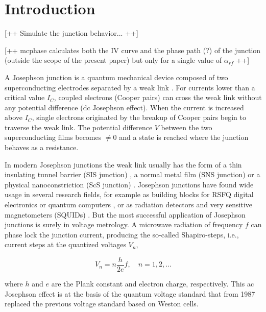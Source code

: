 \section{Introduction}


[++ Simulate the junction behavior... ++]

[++ mcphase calculates both the IV curve and the phase path (?) of the junction (outside the scope of the present paper) but only for a single value of $\alpha_{rf}$   ++]

A Josephson junction is a quantum mechanical device composed of two superconducting electrodes separated by a weak link \cite{Barone:1982}.
For currents lower than a critical value $I_C$, coupled electrons (Cooper pairs) can cross the weak link without any potential difference (dc Josephson effect).
When the current is increased above $I_C$, single electrons originated by the breakup of Cooper pairs begin to traverse the weak link. The potential difference $V$ between the two superconducting films becomes $\neq 0$ and a state is reached where the junction behaves as a resistance.

In modern Josephson junctions the weak link usually has the form of a thin insulating tunnel barrier (SIS junction) \cite{Gurvitch:1983}, a normal metal film (SNS junction) \cite{Benz:1995} or a physical nanoconstriction (ScS junction) \cite{Cybart:2015, DeLeo:2016}. Josephson junctions have found wide usage in several research fields, for example as building blocks for RSFQ digital electronics  or quantum computers \cite{Likharev:1991}, or as radiation detectors and very sensitive magnetometers (SQUIDs) \cite{Maggi:2006b, Granata:2015}.
But the most successful application of Josephson junctions is surely in voltage metrology.
A microwave radiation of frequency $f$ can phase lock the junction current, producing the so-called Shapiro-steps, i.e., current steps at the quantized voltages $V_n$, 

\begin{equation}
	V_n = n \frac{h}{2 e} f, \quad n = 1, 2, ...
\label{eq:voltage_steps}
\end{equation}

where $h$ and $e$ are the Plank constant and electron charge, respectively. This ac Josephson effect is at the basis of the quantum voltage standard that from 1987 replaced the previous voltage standard based on Weston cells.


